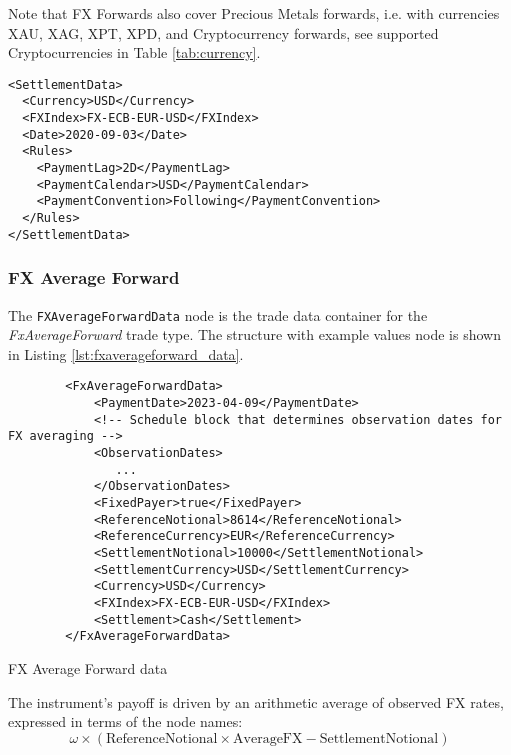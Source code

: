 Note that FX Forwards also cover Precious Metals forwards, i.e. with currencies XAU, XAG, XPT, XPD, and Cryptocurrency forwards,  see supported Cryptocurrencies in Table \ref{tab:currency}.

\begin{listing}[H]
\begin{verbatim}
<SettlementData>
  <Currency>USD</Currency>
  <FXIndex>FX-ECB-EUR-USD</FXIndex>
  <Date>2020-09-03</Date>
  <Rules>
    <PaymentLag>2D</PaymentLag>
    <PaymentCalendar>USD</PaymentCalendar>
    <PaymentConvention>Following</PaymentConvention>
  </Rules>
</SettlementData>
\end{verbatim}
\caption{Example \lstinline!SettlementData! node with \lstinline!Rules! sub-node}
\label{lst:settlement_data_node}
\end{listing}

\subsubsection{FX Average Forward}

The \lstinline!FXAverageForwardData! node is the trade data container for the \emph{FxAverageForward} trade type.  The structure with
example values node is shown in Listing \ref{lst:fxaverageforward_data}.

\begin{listing}[H]
\begin{verbatim}
        <FxAverageForwardData>
            <PaymentDate>2023-04-09</PaymentDate>
            <!-- Schedule block that determines observation dates for FX averaging -->
            <ObservationDates>
               ...
            </ObservationDates>
            <FixedPayer>true</FixedPayer>
            <ReferenceNotional>8614</ReferenceNotional>
            <ReferenceCurrency>EUR</ReferenceCurrency>
            <SettlementNotional>10000</SettlementNotional>
            <SettlementCurrency>USD</SettlementCurrency>
            <Currency>USD</Currency>
            <FXIndex>FX-ECB-EUR-USD</FXIndex>
            <Settlement>Cash</Settlement>
        </FxAverageForwardData>
\end{verbatim}
\caption{FX Average Forward data}
\label{lst:fxaverageforward_data}
\end{listing}

The instrument's payoff is driven by an arithmetic average of observed FX rates, expressed in terms of the node names:
$$
   \omega \times \left( \mbox{ReferenceNotional} \times \mbox{AverageFX} - \mbox{SettlementNotional}\right)
$$
   
